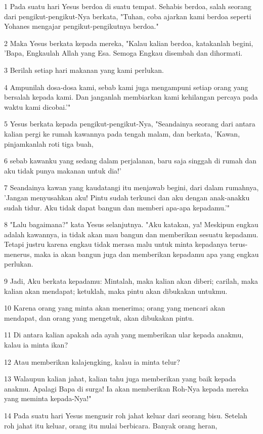 \par 1 Pada suatu hari Yesus berdoa di suatu tempat. Sehabis berdoa, salah seorang dari pengikut-pengikut-Nya berkata, "Tuhan, coba ajarkan kami berdoa seperti Yohanes mengajar pengikut-pengikutnya berdoa."
\par 2 Maka Yesus berkata kepada mereka, "Kalau kalian berdoa, katakanlah begini, 'Bapa, Engkaulah Allah yang Esa. Semoga Engkau disembah dan dihormati.
\par 3 Berilah setiap hari makanan yang kami perlukan.
\par 4 Ampunilah dosa-dosa kami, sebab kami juga mengampuni setiap orang yang bersalah kepada kami. Dan janganlah membiarkan kami kehilangan percaya pada waktu kami dicobai.'"
\par 5 Yesus berkata kepada pengikut-pengikut-Nya, "Seandainya seorang dari antara kalian pergi ke rumah kawannya pada tengah malam, dan berkata, 'Kawan, pinjamkanlah roti tiga buah,
\par 6 sebab kawanku yang sedang dalam perjalanan, baru saja singgah di rumah dan aku tidak punya makanan untuk dia!'
\par 7 Seandainya kawan yang kaudatangi itu menjawab begini, dari dalam rumahnya, 'Jangan menyusahkan aku! Pintu sudah terkunci dan aku dengan anak-anakku sudah tidur. Aku tidak dapat bangun dan memberi apa-apa kepadamu.'"
\par 8 "Lalu bagaimana?" kata Yesus selanjutnya. "Aku katakan, ya! Meskipun engkau adalah kawannya, ia tidak akan mau bangun dan memberikan sesuatu kepadamu. Tetapi justru karena engkau tidak merasa malu untuk minta kepadanya terus-menerus, maka ia akan bangun juga dan memberikan kepadamu apa yang engkau perlukan.
\par 9 Jadi, Aku berkata kepadamu: Mintalah, maka kalian akan diberi; carilah, maka kalian akan mendapat; ketuklah, maka pintu akan dibukakan untukmu.
\par 10 Karena orang yang minta akan menerima; orang yang mencari akan mendapat, dan orang yang mengetuk, akan dibukakan pintu.
\par 11 Di antara kalian apakah ada ayah yang memberikan ular kepada anakmu, kalau ia minta ikan?
\par 12 Atau memberikan kalajengking, kalau ia minta telur?
\par 13 Walaupun kalian jahat, kalian tahu juga memberikan yang baik kepada anakmu. Apalagi Bapa di surga! Ia akan memberikan Roh-Nya kepada mereka yang meminta kepada-Nya!"
\par 14 Pada suatu hari Yesus mengusir roh jahat keluar dari seorang bisu. Setelah roh jahat itu keluar, orang itu mulai berbicara. Banyak orang heran,
